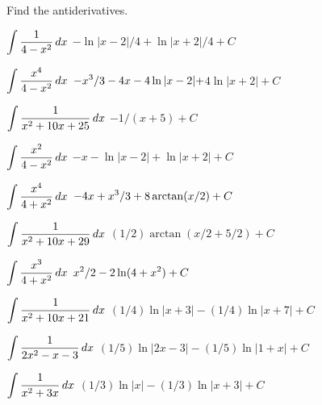 \exercises

Find the antiderivatives.
\twocol

\exercise $\displaystyle\int {1\over 4-x^2}\,dx$
\answer $-\ln|x-2|/4+\ln|x+2|/4+C$
\endanswer
\endexercise

\exercise $\displaystyle\int {x^4\over 4-x^2}\,dx$
\answer $\displaystyle -x^3/3-4x-4\ln|x-2|+$\hfill\break$4\ln|x+2| +C$
\endanswer
\endexercise

\exercise $\displaystyle\int {1\over x^2+10x+25}\,dx$
\answer $-1/(x+5) +C$
\endanswer
\endexercise

\exercise $\displaystyle\int {x^2\over 4-x^2}\,dx$
\answer $-x-\ln|x-2|+\ln|x+2| +C$
\endanswer
\endexercise

\exercise $\displaystyle\int {x^4\over 4+x^2}\,dx$
\answer $\displaystyle -4x+x^3/3+8\arctan(x/2) +C$
\endanswer
\endexercise

\exercise $\displaystyle\int {1\over x^2+10x+29}\,dx$
\answer $(1/2)\arctan(x/2+5/2) +C$
\endanswer
\endexercise

\exercise $\displaystyle\int {x^3\over 4+x^2}\,dx$
\answer $\displaystyle x^2/2-2\ln(4+x^2) +C$
\endanswer
\endexercise

\exercise $\displaystyle\int {1\over x^2+10x+21}\,dx$
\answer $(1/4)\ln|x+3|-(1/4)\ln|x+7| +C$
\endanswer
\endexercise

\exercise $\displaystyle\int {1\over 2x^2-x-3}\,dx$
\answer $(1/5)\ln|2x-3|-(1/5)\ln|1+x| +C$
\endanswer
\endexercise

\exercise $\displaystyle\int {1\over x^2+3x}\,dx$
\answer $(1/3)\ln|x|-(1/3)\ln|x+3| +C$
\endanswer

\endtwocol
\endexercise

\endexercises
